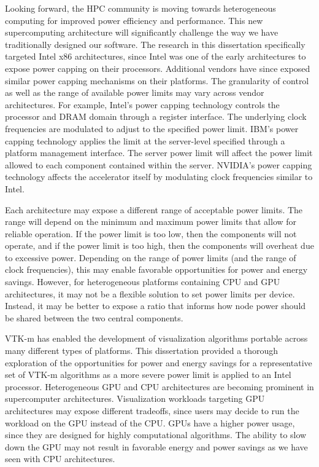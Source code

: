 Looking forward, the HPC community is moving towards heterogeneous computing
for improved power efficiency and performance.
%
This new supercomputing architecture will significantly challenge the way we
have traditionally designed our software.
%
The research in this dissertation specifically targeted Intel x86
architectures, since Intel was one of the early architectures to expose power
capping on their processors.
%
Additional vendors have since exposed similar power capping mechanisms on their
platforms.
%
The granularity of control as well as the range of available power limits may
vary across vendor architectures.
%
For example, Intel's power capping technology controls the processor and DRAM
domain through a register interface.
%
The underlying clock frequencies are modulated to adjust to the specified power
limit.
%
IBM's power capping technology applies the limit at the server-level specified
through a platform management interface.
%
The server power limit will affect the power limit allowed to each component
contained within the server.
%
NVIDIA's power capping technology affects the accelerator itself by modulating
clock frequencies similar to Intel.

Each architecture may expose a different range of acceptable power limits.
%
The range will depend on the minimum and maximum power limits that allow for
reliable operation.
%
If the power limit is too low, then the components will not operate, and if the
power limit is too high, then the components will overheat due to excessive
power.
%
Depending on the range of power limits (and the range of clock frequencies),
this may enable favorable opportunities for power and energy savings.
%
However, for heterogeneous platforms containing CPU and GPU architectures, it
may not be a flexible solution to set power limits per device.
%
Instead, it may be better to expose a ratio that informs how node power should
be shared between the two central components.

VTK-m has enabled the development of visualization algorithms portable across
many different types of platforms.
%
This dissertation provided a thorough exploration of the opportunities for
power and energy savings for a representative set of VTK-m algorithms as a more
severe power limit is applied to an Intel processor.
%
Heterogeneous GPU and CPU architectures are becoming prominent in supercomputer
architectures.
%
Visualization workloads targeting GPU architectures may expose different
tradeoffs, since users may decide to run the workload on the GPU instead
of the CPU.
%
GPUs have a higher power usage, since they are designed for
highly computational algorithms.
%
The ability to slow down the GPU may not result in favorable energy and power
savings as we have seen with CPU architectures.

